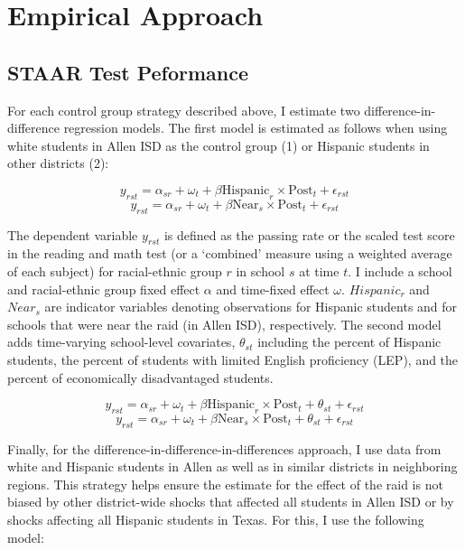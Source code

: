 \documentclass[hidelinks,twoside]{article}
\begin{document}
\section*{Empirical Approach}

\subsection*{STAAR Test Peformance}

For each control group strategy described above, I  estimate two difference-in-difference regression models. The first model is estimated as follows when using white students in Allen ISD as the control group (1) or Hispanic students in other districts (2):


\begin{equation*}
    y_{rst} = \alpha_{sr} + \omega_{t} + \beta \text{Hispanic}_{r} \times \text{Post}_{t} + \epsilon_{rst}
\end{equation*}
\begin{equation*}
       y_{rst} = \alpha_{sr} + \omega_{t} + \beta \text{Near}_{s} \times \text{Post}_{t} + \epsilon_{rst}
    \end{equation*}

\noindent The dependent variable $y_{rst}$ is defined as the passing rate or the scaled test score in the reading and math test (or a `combined' measure using a weighted average of each subject) for racial-ethnic group $r$ in school $s$ at time $t$. I include a school and racial-ethnic group fixed effect $\alpha$ and time-fixed effect $\omega$. $Hispanic_{r}$ and $Near_{s}$ are indicator variables denoting observations for Hispanic students and for schools that were near the raid (in Allen ISD), respectively. The second model adds time-varying school-level covariates, $\theta_{st}$ including the percent of Hispanic students, the percent of students with limited English proficiency (LEP), and the percent of economically disadvantaged students.

\begin{equation*}
    y_{rst} = \alpha_{sr} + \omega_{t} + \beta \text{Hispanic}_{r} \times \text{Post}_{t} + \theta_{st} + \epsilon_{rst}
\end{equation*}
\begin{equation*}
       y_{rst} = \alpha_{sr} + \omega_{t} + \beta \text{Near}_{s} \times \text{Post}_{t} + \theta_{st} + \epsilon_{rst}
    \end{equation*}

\noindent Finally, for the difference-in-difference-in-differences approach, I use data from white and Hispanic students in Allen as well as in similar districts in neighboring regions. This strategy helps ensure the estimate for the effect of the raid is not biased by other district-wide shocks that affected all students in Allen ISD or by shocks affecting all Hispanic students in Texas. For this, I use the following model:
\end{document}
